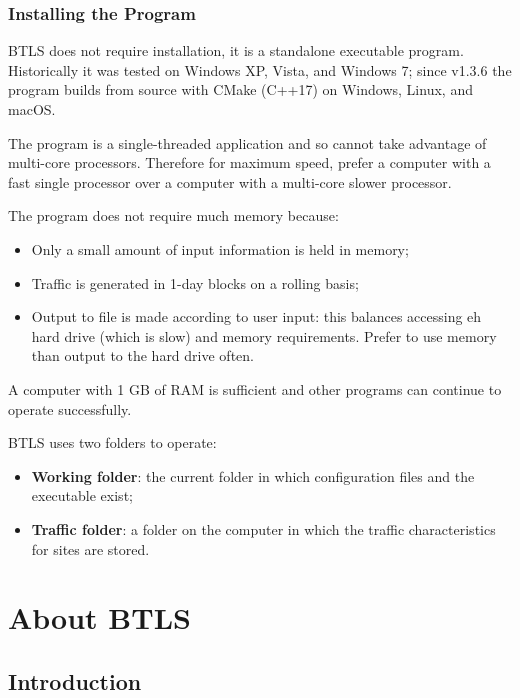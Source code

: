 \documentclass[
]{article}
\begin{document}
\subsubsection*{\texorpdfstring{\hfill\break
Installing the
Program}{ Installing the Program}}\label{installing-the-program}

BTLS does not require installation, it is a standalone executable
program. Historically it was tested on Windows XP, Vista, and
Windows 7; since v1.3.6 the program builds from source with CMake
(C++17) on Windows, Linux, and macOS.

The program is a single-threaded application and so cannot take
advantage of multi-core processors. Therefore for maximum speed,
prefer a computer with a fast single processor over a computer with a
multi-core slower processor.

The program does not require much memory because:

\begin{itemize}
\item
  Only a small amount of input information is held in memory;
\item
  Traffic is generated in 1-day blocks on a rolling basis;
\item
  Output to file is made according to user input: this balances
  accessing eh hard drive (which is slow) and memory requirements.
  Prefer to use memory than output to the hard drive often.
\end{itemize}

A computer with 1 GB of RAM is sufficient and other programs can
continue to operate successfully.

BTLS uses two folders to operate:

\begin{itemize}
\item
  \textbf{Working folder}: the current folder in which configuration
  files and the executable exist;
\item
  \textbf{Traffic folder}: a folder on the computer in which the traffic
  characteristics for sites are stored.
\end{itemize}

\section{About BTLS}\label{about-btls}

\subsection{Introduction}\label{introduction-1}
\end{document}
